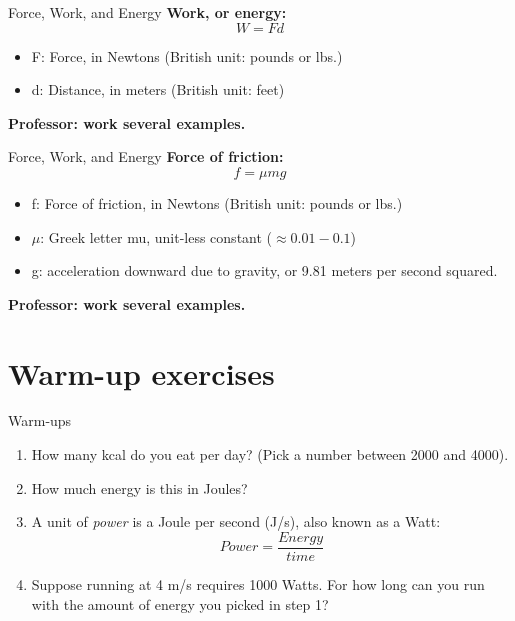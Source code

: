 \documentclass{beamer}
\begin{document}
\begin{frame}{Force, Work, and Energy}
\textbf{Work, or energy:} 
\begin{equation}
W = F d
\end{equation}
\begin{itemize}
\item F: Force, in Newtons (British unit: pounds or lbs.)
\item d: Distance, in meters (British unit: feet)
\end{itemize}
\textbf{Professor: work several examples.}
\end{frame}

\begin{frame}{Force, Work, and Energy}
\textbf{Force of friction:} 
\begin{equation}
f = \mu m g
\end{equation}
\begin{itemize}
\item f: Force of friction, in Newtons (British unit: pounds or lbs.)
\item $\mu$: Greek letter mu, unit-less constant ($\approx 0.01 - 0.1$)
\item g: acceleration downward due to gravity, or 9.81 meters per second squared.
\end{itemize}
\textbf{Professor: work several examples.}
\end{frame}

\section{Warm-up exercises}

\begin{frame}{Warm-ups}
\begin{enumerate}
\item How many kcal do you eat per day? (Pick a number between 2000 and 4000).
\item How much energy is this in Joules?
\item A unit of \textit{power} is a Joule per second (J/s), also known as a Watt:
\begin{equation}
Power = \frac{Energy}{time}
\end{equation}
\item Suppose running at 4 m/s requires 1000 Watts.  For how long can you run with the amount of energy you picked in step 1?
\end{enumerate}
\end{frame}
\end{document}
